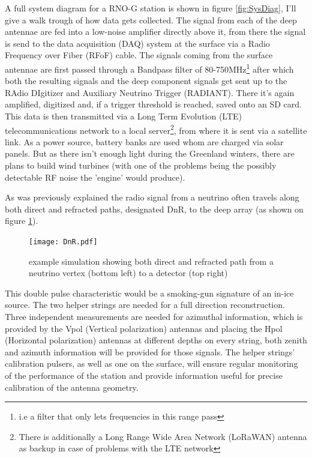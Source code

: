 A full system diagram for a RNO-G station is shown in figure \ref{fig:SysDiag},
I'll give a walk trough of how data gets collected.  The signal from each of
the deep antennae are fed into a low-noise amplifier directly above it, from
there the signal is send to the data acquisition (DAQ) system at the surface
via a Radio Frequency over Fiber (RFoF) cable.  The signals coming from the
surface antennae are first passed through a Bandpass filter of
80-750MHz\footnote{i.e a filter that only lets frequencies in this range pass}
after which both the resulting signals and the deep component signals get sent
up to the RAdio DIgitizer and Auxiliary Neutrino Trigger (RADIANT). There it's
again amplified, digitized and, if a trigger threshold is reached, saved onto
an SD card. This data is then transmitted via a Long Term Evolution (LTE)
telecommunications network to a local server\footnote{There is additionally a
Long Range Wide Area Network (LoRaWAN) antenna as backup in case of problems
with the LTE network}, from where it is sent via a satellite link.
As a power source, battery banks are used whom are charged via solar panels.
But as there isn't enough light during the Greenland winters, there are plans to
build wind turbines (with one of the problems being the possibly detectable RF
noise the 'engine' would produce).

As was previously explained the radio signal from a neutrino often travels
along both direct and refracted paths, designated DnR, to the deep array (as shown
on figure \ref{fig:DnR}).
\begin{figure}
  \centering
  \texttt{[image: DnR.pdf]}
  \caption{example simulation showing both direct and refracted path from a neutrino vertex (bottom left) to a detector (top right)}
  \label{fig:DnR}
\end{figure}
This double pulse characteristic would be a smoking-gun signature of an in-ice
source. The two helper strings are needed for a full direction reconstruction.
Three independent measurements are needed for azimuthal information, which is
provided by the Vpol (Vertical polarization) antennas and placing the Hpol
(Horizontal polarization) antennas at different depths on every string, both
zenith and azimuth information will be provided for those signals. The helper
strings' calibration pulsers, as well as one on the surface, will ensure
regular monitoring of the performance of the station and provide information
useful for precise calibration of the antenna geometry.
